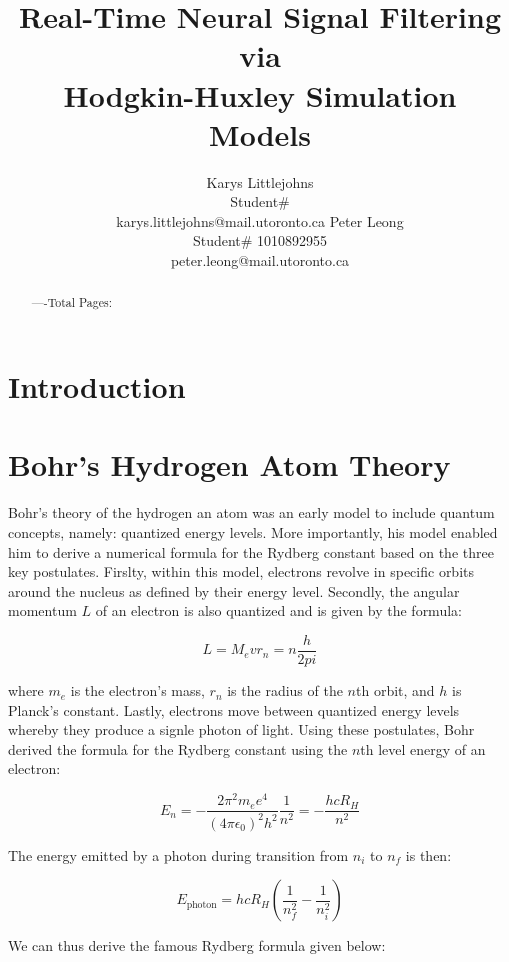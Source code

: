 \documentclass{article} %
\title{Real-Time Neural Signal Filtering via \\
Hodgkin-Huxley Simulation Models}
\author{Karys Littlejohns\\
Student\# \\
karys.littlejohns@mail.utoronto.ca
\And
Peter Leong \\
Student\# 1010892955 \\
peter.leong@mail.utoronto.ca \\
\AND
}
\begin{document}
\maketitle

\vspace{-6ex}

\begin{abstract}

----Total Pages: \pageref{last_page}
\end{abstract}

\vspace{2ex}

\begin{multicols}{2}

\section{Introduction}

\section{Bohr's Hydrogen Atom Theory}

Bohr's theory of the hydrogen an atom was an early model to include quantum concepts, namely: quantized energy levels.
More importantly, his model enabled him to derive a numerical formula for the Rydberg constant based on the three key postulates.
Firslty, within this model, electrons revolve in specific orbits around the nucleus as defined by their energy level.
Secondly, the angular momentum $L$ of an electron is also quantized and is given by the formula:

\[
L = M_{e}vr_{n} = n \frac{h}{2pi}
\]

where $m_{e}$ is the electron's mass, $r_{n}$ is the radius of the $n$th orbit, and $h$ is Planck's constant.
Lastly, electrons move between quantized energy levels whereby they produce a signle photon of light.
Using these postulates, Bohr derived the formula for the Rydberg constant using the $n$th level energy of an electron:

\[
E_n = -\frac{2\pi^2 m_e e^4}{(4\pi\epsilon_0)^2 h^2} \frac{1}{n^2} = -\frac{hc R_H}{n^2}
\]

The energy emitted by a photon during transition from $n_i$ to $n_f$ is then:

\[
E_{\text{photon}} = hc R_H \left( \frac{1}{n_f^2} - \frac{1}{n_i^2} \right) 
\]

We can thus derive the famous Rydberg formula given below:


\end{multicols}
\end{document}
